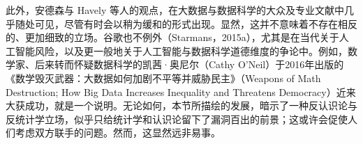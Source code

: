 此外，安德森与 Havely 等人的观点，在大数据与数据科学的大众及专业文献中几乎随处可见，尽管有时会以稍为缓和的形式出现。显然，这并不意味着不存在相反的、更加细致的立场。谷歌也不例外（Starmans，2015a），尤其是在当代关于人工智能风险，以及更一般地关于人工智能与数据科学道德维度的争论中。例如，数学家、后来转而怀疑数据科学的凯茜·奥尼尔（Cathy O'Neil）于2016年出版的《数学毁灭武器：大数据如何加剧不平等并威胁民主》（Weapons of Math Destruction; How Big Data Increases Inequality and Threatens Democracy）近来大获成功，就是一个说明。无论如何，本节所描绘的发展，暗示了一种反认识论与反统计学立场，似乎只给统计学和认识论留下了漏洞百出的前景；这或许会促使人们考虑双方联手的问题。然而，这显然远非易事。
